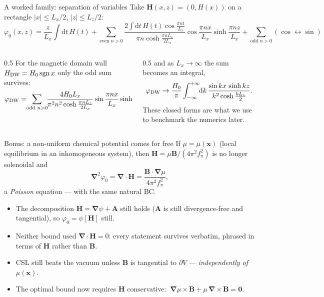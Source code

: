 \documentclass[aspectratio=169,10pt]{beamer}
\newcommand{\B}{\bm{B}}
\newcommand{\Hb}{\bm{H}}
\newcommand{\gr}{\bm{\nabla}}
\newcommand{\fpi}{f_\pi}
\newcommand{\dd}{\mathrm{d}}
\begin{document}
\begin{frame}{A worked family: separation of variables}
Take $\Hb(x,z)=(0,H(x))$ on a rectangle $|x|\le L_x/2$, $|z|\le L_z/2$:
{\small
\[
 \varphi_0(x,z)=\frac{z}{L_x}\!\int\! \dd t\,H(t)
 +\!\!\sum_{\text{even }n>0}\!\!\frac{2\!\int\!\dd t\,H(t)\cos\frac{\pi nt}{L_x}}
 {\pi n\cosh\frac{\pi nL_z}{2L_x}}\cos\frac{\pi nx}{L_x}\sinh\frac{\pi nz}{L_x}
 +\!\!\sum_{\text{odd }n>0}\!\!(\cos\leftrightarrow\sin)
\]}
\vspace{-3mm}
\begin{columns}[T,onlytextwidth]
\begin{column}{0.5\textwidth}
For the \alert{magnetic domain wall} $H_{\rm DW}=H_0\,\mathrm{sgn}\,x$ only the
odd sum survives:
\[
 \varphi_{\rm DW}=\!\!\sum_{\text{odd }n>0}\!\!
 \frac{4H_0L_x}{\pi^2n^2\cosh\frac{\pi nL_z}{2L_x}}
 \sin\frac{\pi nx}{L_x}\sinh\frac{\pi nz}{L_x}
\]
\end{column}
\begin{column}{0.5\textwidth}
and as $L_x\to\infty$ the sum becomes an integral,
\[
 \varphi_{\rm DW}\to\frac{H_0}{\pi}\int_{-\infty}^{+\infty}\!\!\dd k\,
 \frac{\sin kx\,\sinh kz}{k^2\cosh\frac{kL_z}{2}}.
\]
\vspace{1mm}
{\small These closed forms are what we use to benchmark the numerics later.}
\end{column}
\end{columns}
\end{frame}

\begin{frame}{Bonus: a non-uniform chemical potential comes for free}
If $\mu=\mu(\bm x)$ (local equilibrium in an inhomogeneous system), then
$\Hb=\mu\B/(4\pi^2\fpi^2)$ is no longer solenoidal and
\[
 \gr^2\varphi_0=\gr\cdot\Hb=\frac{\B\cdot\gr\mu}{4\pi^2\fpi^2},
\]
a \emph{Poisson} equation --- with the same natural BC.
\vspace{2mm}
\begin{itemize}
  \item The decomposition $\Hb=\gr\psi+\bm A$ still holds ($\bm A$ is still
        divergence-free and tangential), so $\varphi_0=\psi[\Hb]$ \alert{still}.
  \item Neither bound used $\gr\cdot\Hb=0$: every statement survives verbatim,
        phrased in terms of $\Hb$ rather than $\B$.
  \item CSL still beats the vacuum unless $\B$ is tangential to $\partial V$
        --- \emph{independently of $\mu(\bm x)$}.
  \item The optimal bound now requires $\Hb$ conservative:
        $\ \gr\mu\times\B+\mu\,\gr\times\B=\bm0$.
\end{itemize}
\end{frame}
\end{document}
